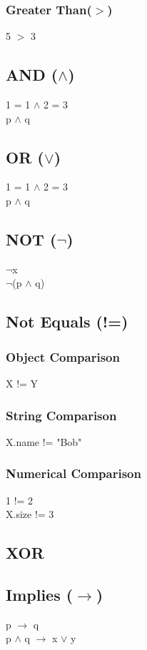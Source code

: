 \documentclass{article}
\begin{document}
	\subsubsection*{Greater Than($>$)}
	5 $>$ 3
	
	\subsection{AND ($\land$)}
	1 = 1 $\land$ 2 = 3 \\
	p $\land$ q
	
	\subsection{OR ($\lor$)}
	1 = 1 $\land$ 2 = 3 \\
	p $\land$ q
	
	\subsection{NOT ($\lnot$)}
	$\lnot$x \\
	$\lnot$(p $\land$ q) 
	
	\subsection{Not Equals (!=)}
	
	\subsubsection*{Object Comparison}
	X != Y
	
	\subsubsection*{String Comparison}
	X.name != "Bob"
	
	\subsubsection*{Numerical Comparison}
	1 != 2 \\
	X.size != 3
	
	\subsection{XOR}
	
	\subsection{Implies ($\rightarrow$)}
	p $\rightarrow$ q \\
	p $\land$ q $\rightarrow$ x $\lor$ y
	
\end{document}
